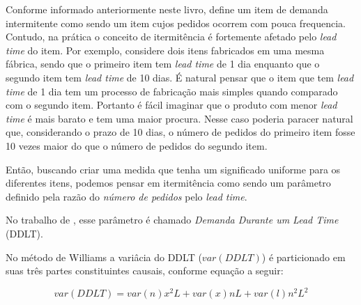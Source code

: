 \documentclass{book}
\begin{document}
Conforme informado anteriormente neste livro, \cite{BoylanEtAl2008} define um item de demanda intermitente como sendo um item cujos pedidos ocorrem com pouca frequencia. Contudo, na prática o conceito de itermitência é fortemente afetado pelo \emph{lead time} do item. Por exemplo, considere dois itens fabricados em uma mesma fábrica, sendo que o primeiro item tem \emph{lead time} de 1 dia enquanto que o segundo item tem \emph{lead time} de 10 dias. É natural pensar que o item que tem \emph{lead time} de 1 dia tem um processo de fabricação mais simples quando comparado com o segundo item. Portanto é fácil imaginar que o produto com menor \emph{lead time} é mais barato e tem uma maior procura. Nesse caso poderia paracer natural que, considerando o prazo de 10 dias, o número de pedidos do primeiro item fosse 10 vezes maior do que o número de pedidos do segundo item. 

Então, buscando criar uma medida que tenha um significado uniforme para os diferentes itens, podemos pensar em itermitência como sendo um parâmetro definido pela razão do \emph{número de pedidos} pelo \emph{lead time}.   

No trabalho de \cite{Williams1984}, esse parâmetro é chamado \emph{Demanda Durante um Lead Time} (DDLT). 

No método de Williams a variâcia do DDLT ($var(DDLT)$) é particionado em suas três partes constituintes causais, conforme equação a seguir:

\begin{equation}
var(DDLT) = var(n) x^2 L + var(x) n L + var(l) n^2 L^2
\end{equation}
\end{document}
